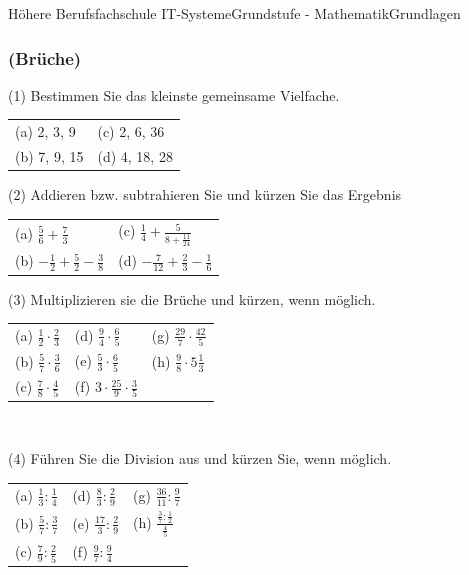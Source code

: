 \documentclass[11pt,twocolumn,oneside,openany,headings=optiontotoc,11pt,numbers=noenddot]{article}
\begin{document}
\begin{worksheet}{Höhere Berufsfachschule IT-Systeme}{Grundstufe - Mathematik}{Grundlagen}
		\subsubsection*{(Brüche)}
		(1) Bestimmen Sie das kleinste gemeinsame Vielfache.\\
		\begin{tabularx}{0.5\textwidth}{XX}
			(a) 2, 3, 9 & (c) 2, 6, 36\\
			(b) 7, 9, 15 & (d) 4, 18, 28
		\end{tabularx}
		\par\bigskip\noindent
		(2) Addieren bzw. subtrahieren Sie und kürzen Sie das Ergebnis
		\begin{tabularx}{0.5\textwidth}{XX}
			(a) \(\frac{5}{6} + \frac{7}{3}\) & (c) \(\frac{1}{4} + \frac{5}{8 + \frac{11}{24}}\)\\
			(b) \(-\frac{1}{2}+\frac{5}{2}-\frac{3}{8}\) & (d) \(-\frac{7}{12} + \frac{2}{3} - \frac{1}{6}\)
		\end{tabularx}
		\par\bigskip\noindent
		(3) Multiplizieren sie die Brüche und kürzen, wenn möglich.
		\begin{tabularx}{0.5\textwidth}{XXX}
			(a) \(\frac{1}{2}\cdot\frac{2}{3}\) & (d) \(\frac{9}{4}\cdot\frac{6}{5}\) & (g) \(\frac{29}{7}\cdot\frac{42}{5}\)\\
			(b) \(\frac{5}{7}\cdot\frac{3}{6}\) & (e) \(\frac{5}{3}\cdot\frac{6}{5}\) & (h) \(\frac{9}{8}\cdot{}5\frac{1}{3}\)\\
			(c) \(\frac{7}{8}\cdot\frac{4}{5}\) & (f) \(3\cdot\frac{25}{9}\cdot\frac{3}{5}\)
		\end{tabularx}\\
		\par\bigskip\noindent
		(4) Führen Sie die Division aus und kürzen Sie, wenn möglich.
		\begin{tabularx}{0.5\textwidth}{XXX}
			(a) \(\frac{1}{3}:\frac{1}{4}\) & (d) \(\frac{8}{3}:\frac{2}{9}\) & (g) \(\frac{36}{11}:\frac{9}{7}\)\\
			(b) \(\frac{5}{7}:\frac{3}{7}\) & (e) \(\frac{17}{3}:\frac{2}{9}\) & (h) \(\frac{\frac{3}{7}:\frac{1}{2}}{\frac{4}{5}}\)\\
			(c) \(\frac{7}{9}:\frac{2}{5}\) & (f) \(\frac{9}{7}:\frac{9}{4}\)
		\end{tabularx}\\

\end{worksheet}
\end{document}
